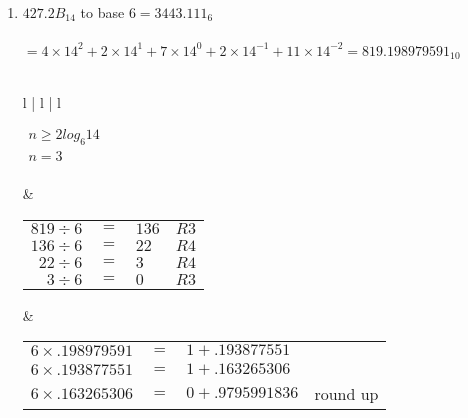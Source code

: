 \documentclass[12pt]{article}
\begin{document}
\begin{enumerate}
\begin{tabular}{l | l | l}
       &

       \begin{tabular}{r c l l}
           $5 \times .140625$ & $=$ & $0 + .703125$ & \\
           $5 \times .703125$ & $=$ & $3 + .515625$ & \\
           $5 \times .515625$ & $=$ & $2 + .578125$ & \\
           $5 \times .578125$ & $=$ & $2 + .890625$ & round up \\
       \end{tabular}
       
    \end{tabular}

    \pagebreak

    \item $427.2B_{14}$ to base $6 = \boxed{3443.111_{6}}$ \\ \\
    $ = 4 \times 14^2 + 2 \times 14^1 + 7 \times 14^0 + 2 \times 14^{-1} + 11 \times 14^{-2} = 819.198979591_{10}$ \\\\
    
       \begin{tabular}{l | l | l} 

       $\begin{aligned}
           n \geq 2log_{6}14 \\
           n = 3 \\
       \end{aligned}$

       &

       \begin{tabular}{r c l l}
           $819 \div 6$  & $=$ & $136$ & $R3$ \\
           $136 \div 6$  & $=$ & $22$ & $R4$  \\
           $22 \div 6$   & $=$ & $3$  & $R4$  \\
           $3 \div 6$    & $=$ & $0$  & $R3$  \\
       \end{tabular}

       &

       \begin{tabular}{r c l l}
           $6 \times .198979591$ & $=$ & $1 + .193877551$  & \\
           $6 \times .193877551$ & $=$ & $1 + .163265306$  & \\
           $6 \times .163265306$ & $=$ & $0 + .9795991836$ & round up \\
       \end{tabular}
       

\end{tabular}
\end{enumerate}
\end{document}

